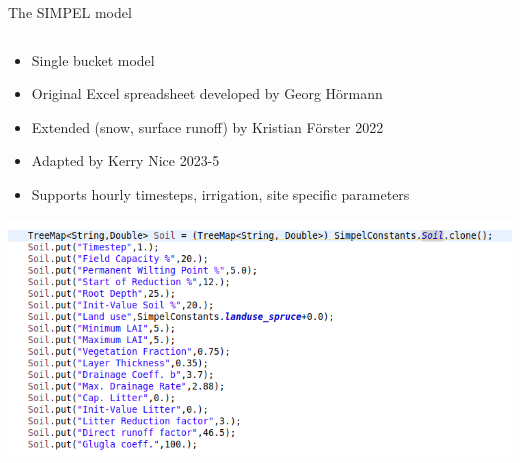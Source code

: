 \documentclass{beamer}
\begin{document}
\begin{frame}{The SIMPEL model} 


\begin{columns}

\begin{column}{0.5\textwidth}
\begin{itemize}
\item Single bucket model
\item Original Excel spreadsheet developed by Georg Hörmann
\item Extended (snow, surface runoff) by Kristian Förster 2022
\item Adapted by Kerry Nice 2023-5
\item Supports hourly timesteps, irrigation, site specific parameters
\end{itemize}
\includegraphics[scale=0.33]{Screenshot_20250703_140316.png}
\end{column}


\end{columns}
\end{frame}
\end{document}
